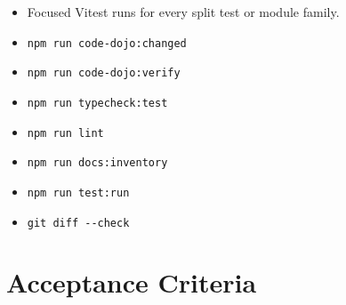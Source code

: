 \begin{itemize}
\tightlist
\item
  Focused Vitest runs for every split test or module family.
\item
  \texttt{n\allowbreak{}p\allowbreak{}m\allowbreak{} \allowbreak{}r\allowbreak{}u\allowbreak{}n\allowbreak{} \allowbreak{}c\allowbreak{}o\allowbreak{}d\allowbreak{}e\allowbreak{}-\allowbreak{}d\allowbreak{}o\allowbreak{}j\allowbreak{}o\allowbreak{}:\allowbreak{}c\allowbreak{}h\allowbreak{}a\allowbreak{}n\allowbreak{}g\allowbreak{}e\allowbreak{}d}
\item
  \texttt{n\allowbreak{}p\allowbreak{}m\allowbreak{} \allowbreak{}r\allowbreak{}u\allowbreak{}n\allowbreak{} \allowbreak{}c\allowbreak{}o\allowbreak{}d\allowbreak{}e\allowbreak{}-\allowbreak{}d\allowbreak{}o\allowbreak{}j\allowbreak{}o\allowbreak{}:\allowbreak{}v\allowbreak{}e\allowbreak{}r\allowbreak{}i\allowbreak{}f\allowbreak{}y}
\item
  \texttt{n\allowbreak{}p\allowbreak{}m\allowbreak{} \allowbreak{}r\allowbreak{}u\allowbreak{}n\allowbreak{} \allowbreak{}t\allowbreak{}y\allowbreak{}p\allowbreak{}e\allowbreak{}c\allowbreak{}h\allowbreak{}e\allowbreak{}c\allowbreak{}k\allowbreak{}:\allowbreak{}t\allowbreak{}e\allowbreak{}s\allowbreak{}t}
\item
  \texttt{n\allowbreak{}p\allowbreak{}m\allowbreak{} \allowbreak{}r\allowbreak{}u\allowbreak{}n\allowbreak{} \allowbreak{}l\allowbreak{}i\allowbreak{}n\allowbreak{}t}
\item
  \texttt{n\allowbreak{}p\allowbreak{}m\allowbreak{} \allowbreak{}r\allowbreak{}u\allowbreak{}n\allowbreak{} \allowbreak{}d\allowbreak{}o\allowbreak{}c\allowbreak{}s\allowbreak{}:\allowbreak{}i\allowbreak{}n\allowbreak{}v\allowbreak{}e\allowbreak{}n\allowbreak{}t\allowbreak{}o\allowbreak{}r\allowbreak{}y}
\item
  \texttt{n\allowbreak{}p\allowbreak{}m\allowbreak{} \allowbreak{}r\allowbreak{}u\allowbreak{}n\allowbreak{} \allowbreak{}t\allowbreak{}e\allowbreak{}s\allowbreak{}t\allowbreak{}:\allowbreak{}r\allowbreak{}u\allowbreak{}n}
\item
  \texttt{g\allowbreak{}i\allowbreak{}t\allowbreak{} \allowbreak{}d\allowbreak{}i\allowbreak{}f\allowbreak{}f\allowbreak{} \allowbreak{}-\allowbreak{}-\allowbreak{}c\allowbreak{}h\allowbreak{}e\allowbreak{}c\allowbreak{}k}
\end{itemize}

\section{Acceptance Criteria}\label{record-245-acceptance-criteria}

